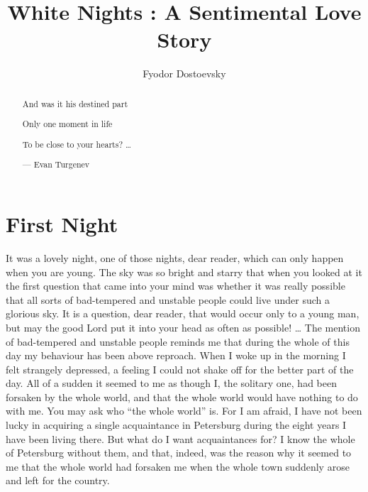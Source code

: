 \documentclass[a4paper,10pt]{article}
\title{White Nights : A Sentimental Love Story}
\author{Fyodor Dostoevsky}
\begin{document}
\maketitle

\begin{abstract}

    And was it his destined part

    Only one moment in life

    To be close to your hearts? \dots

    --- Evan Turgenev

\end{abstract}

\section{First Night}

It was a lovely night, one of those nights, dear reader, which can only happen when you are young.
The sky was so bright and starry that when you looked at it the first question that came into your mind was whether it was really possible that all sorts of bad-tempered and unstable people could live under such a glorious sky.
It is a question, dear reader, that would occur only to a young man, but may the good Lord put it  into your head as often as possible! \dots
The mention of bad-tempered and unstable people reminds me that during the whole of this day my behaviour has been above reproach.
When I woke up in the morning I felt strangely depressed, a feeling I could not shake off for the better part of the day.
All of a sudden it seemed to me as though I, the solitary one, had been forsaken by the whole world, and that the whole world would have nothing to do with me.
You may ask who ``the whole world'' is.
For I am afraid, I have not been lucky in acquiring a single acquaintance in Petersburg during the eight years I have been living there.
But what do I want acquaintances for?
I know the whole of Petersburg without them, and that, indeed, was the reason why it seemed to me that the whole world had forsaken me when the whole town suddenly arose and left for the country.
\end{document}
